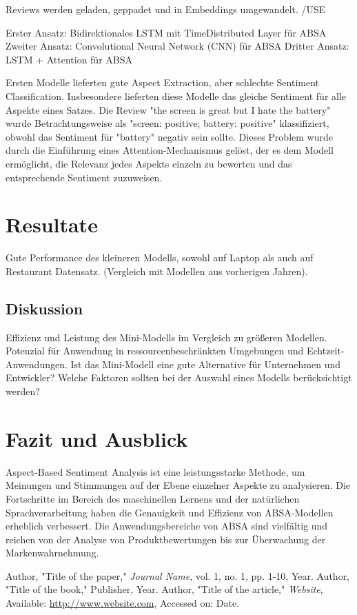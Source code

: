 \documentclass[12pt]{article}
\begin{document}
Reviews werden geladen, geppadet und in Embeddings umgewandelt. /USE

Erster Ansatz: Bidirektionales LSTM mit TimeDistributed Layer für ABSA
Zweiter Ansatz: Convolutional Neural Network (CNN) für ABSA
Dritter Ansatz: LSTM + Attention für ABSA

Ersten Modelle lieferten gute Aspect Extraction, aber schlechte Sentiment Classification. Insbesondere lieferten diese Modelle das gleiche Sentiment 
für alle Aspekte eines Satzes. Die Review "the screen is great but I hate the battery" wurde Betrachtungsweise als "screen: positive; battery: positive" 
klassifiziert, obwohl das Sentiment für "battery" negativ sein sollte. Dieses Problem wurde durch die Einführung eines Attention-Mechanismus gelöst, 
der es dem Modell ermöglicht, die Relevanz jedes Aspekts einzeln zu bewerten und das entsprechende Sentiment zuzuweisen.

\section{Resultate}
Gute Performance des kleineren Modells, sowohl auf Laptop als auch auf Restaurant Datensatz. (Vergleich mit Modellen aus vorherigen Jahren).
\subsection{Diskussion}
Effizienz und Leistung des Mini-Modells im Vergleich zu größeren Modellen. Potenzial für Anwendung in ressourcenbeschränkten Umgebungen und Echtzeit-Anwendungen.
Ist das Mini-Modell eine gute Alternative für Unternehmen und Entwickler? Welche Faktoren sollten bei der Auswahl eines Modells berücksichtigt werden?

\section{Fazit und Ausblick}
Aspect-Based Sentiment Analysis ist eine leistungsstarke Methode, um Meinungen und Stimmungen auf der Ebene einzelner Aspekte zu analysieren.
Die Fortschritte im Bereich des maschinellen Lernens und der natürlichen Sprachverarbeitung haben die Genauigkeit und Effizienz von ABSA-Modellen 
erheblich verbessert. Die Anwendungsbereiche von ABSA sind vielfältig und reichen von der Analyse von Produktbewertungen bis zur Überwachung der 
Markenwahrnehmung.
\begin{thebibliography}{9}
 Author, "Title of the paper," \textit{Journal Name}, vol. 1, no. 1, pp. 1-10, Year.
 Author, "Title of the book," Publisher, Year.
 Author, "Title of the article," \textit{Website}, Available: \url{http://www.website.com}, Accessed on: Date.
\end{thebibliography}
\end{document}
